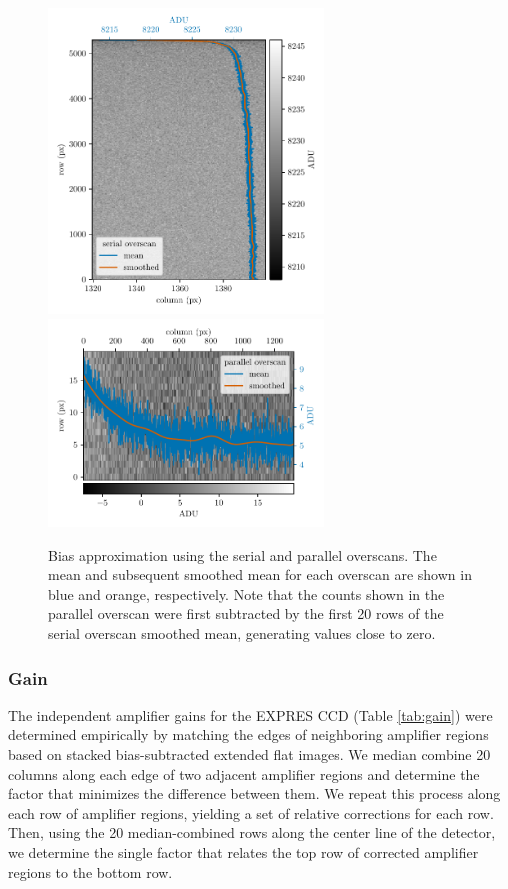 \begin{figure}
    \centering
    \includegraphics[width=0.65\textwidth]{figures-4/ser_oscan}
    \includegraphics[width=0.65\textwidth]{figures-4/vert_oscan}
    \caption[EXPRES detector bias approximation from overscan regions]{Bias approximation using the serial and parallel overscans. The mean and subsequent smoothed mean for each overscan are shown in blue and orange, respectively. Note that the counts shown in the parallel overscan were first subtracted by the first 20 rows of the serial overscan smoothed mean, generating values close to zero.}
    \label{fig:overscan}
\end{figure}

\subsubsection{Gain}
\label{pipeline:gain}

The independent amplifier gains for the EXPRES CCD (Table \ref{tab:gain}) were determined empirically by matching the edges of neighboring amplifier regions based on stacked bias-subtracted extended flat images. We median combine 20 columns along each edge of two adjacent amplifier regions and determine the factor that minimizes the difference between them. We repeat this process along each row of amplifier regions, yielding a set of relative corrections for each row. Then, using the 20 median-combined rows along the center line of the detector, we determine the single factor that relates the top row of corrected amplifier regions to the bottom row.

